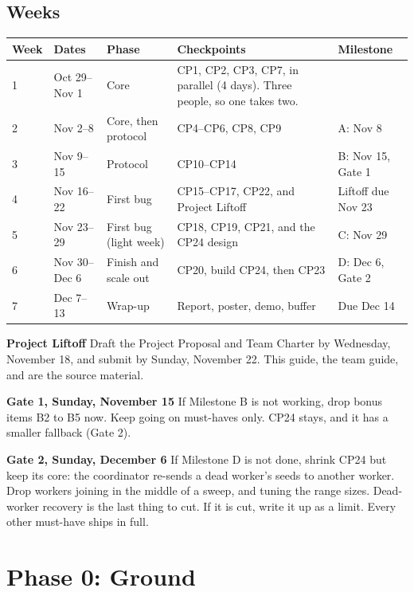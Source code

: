 \documentclass[11pt,letterpaper]{article}
\newcommand{\code}[1]{\texttt{\detokenize{#1}}}
\newcommand{\lbl}[1]{\textbf{#1}\enspace}
\begin{document}
\subsection{Weeks}

\begin{center}
\small
\begin{tabularx}{\linewidth}{@{}l l l X l@{}}
\toprule
\textbf{Week} & \textbf{Dates} & \textbf{Phase} & \textbf{Checkpoints} & \textbf{Milestone} \\
\midrule
1 & Oct 29--Nov 1 & Core & CP1, CP2, CP3, CP7, in parallel (4 days). Three people, so one takes two. & \\
2 & Nov 2--8      & Core, then protocol & CP4--CP6, CP8, CP9 & A: Nov 8 \\
3 & Nov 9--15     & Protocol & CP10--CP14 & B: Nov 15, Gate 1 \\
4 & Nov 16--22    & First bug & CP15--CP17, CP22, and Project Liftoff & Liftoff due Nov 23 \\
5 & Nov 23--29    & First bug (light week) & CP18, CP19, CP21, and the CP24 design & C: Nov 29 \\
6 & Nov 30--Dec 6 & Finish and scale out & CP20, build CP24, then CP23 & D: Dec 6, Gate 2 \\
7 & Dec 7--13     & Wrap-up & Report, poster, demo, buffer & Due Dec 14 \\
\bottomrule
\end{tabularx}
\end{center}

\lbl{Project Liftoff} Draft the Project Proposal and Team Charter by Wednesday, November 18, and submit by Sunday, November 22. This guide, the team guide, and \code{docs/plan.md} are the source material.

\lbl{Gate 1, Sunday, November 15} If Milestone B is not working, drop bonus items B2 to B5 now. Keep going on must-haves only. CP24 stays, and it has a smaller fallback (Gate 2).

\lbl{Gate 2, Sunday, December 6} If Milestone D is not done, shrink CP24 but keep its core: the coordinator re-sends a dead worker's seeds to another worker. Drop workers joining in the middle of a sweep, and tuning the range sizes. Dead-worker recovery is the last thing to cut. If it is cut, write it up as a limit. Every other must-have ships in full.

\section{Phase 0: Ground}
\end{document}
